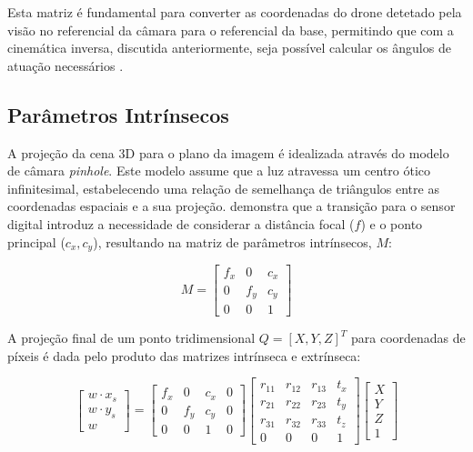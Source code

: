Esta matriz é fundamental para converter as coordenadas do drone detetado pela visão no referencial da câmara para o referencial da base, permitindo que com a cinemática inversa, discutida anteriormente, seja possível calcular os ângulos de atuação necessários \cite{szeliski2022}.

\subsection{Parâmetros Intrínsecos} 

A projeção da cena 3D para o plano da imagem é idealizada através do modelo de câmara \emph{pinhole}. Este modelo assume que a luz atravessa um centro ótico infinitesimal, estabelecendo uma relação de semelhança de triângulos entre as coordenadas espaciais e a sua projeção. \cite{OpenCV} demonstra que a transição para o sensor digital introduz a necessidade de considerar a distância focal ($f$) e o ponto principal ($c_x, c_y$), resultando na matriz de parâmetros intrínsecos, $M$:

\begin{equation}
M = \begin{bmatrix} 
f_x & 0 & c_x \\ 
0 & f_y & c_y \\ 
0 & 0 & 1 
\end{bmatrix}
\end{equation}

A projeção final de um ponto tridimensional $Q = [X, Y, Z]^T$ para coordenadas de píxeis é dada pelo produto das matrizes intrínseca e extrínseca:

\begin{equation}
\begin{bmatrix}
w \cdot x_s \\
w \cdot y_s \\
w
\end{bmatrix} = 
\begin{bmatrix} 
f_x & 0 & c_x & 0 \\ 
0 & f_y & c_y & 0 \\ 
0 & 0 & 1 & 0 
\end{bmatrix}
\begin{bmatrix} 
r_{11} & r_{12} & r_{13} & t_x \\ 
r_{21} & r_{22} & r_{23} & t_y \\ 
r_{31} & r_{32} & r_{33} & t_z \\ 
0 & 0 & 0 & 1 
\end{bmatrix}
\begin{bmatrix} 
X \\ 
Y \\ 
Z \\ 
1 
\end{bmatrix}
\end{equation}


